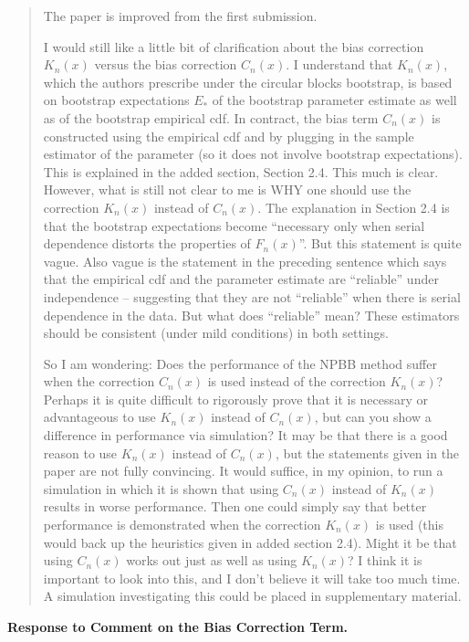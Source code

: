 \documentclass[12pt]{article}
\newenvironment{comment}%
{\begin{quotation}\noindent\small\it\color{darkblue}\ignorespaces%
}{\end{quotation}}
\begin{document}
\begin{comment}
The paper is improved from the first submission.


I would still like a little bit of clarification about the bias
correction $K_n(x)$ versus the bias correction $C_n(x)$. I understand
that $K_n(x)$, which the authors prescribe under the circular blocks
bootstrap, is based on bootstrap expectations $E_*$ of the bootstrap
parameter estimate as well as of the bootstrap empirical cdf. In
contract, the bias term $C_n(x)$ is constructed using the empirical
cdf and by plugging in the sample estimator of the parameter (so it
does not involve bootstrap expectations).  This is explained in the
added section, Section 2.4.  This much is clear. However, what is
still not clear to me is WHY one should use the correction $K_n(x)$
instead of $C_n(x)$. The explanation in Section 2.4 is that the
bootstrap expectations become ``necessary only when serial dependence
distorts the properties of $F_n(x)$''.  But this statement is quite
vague.  Also vague is the statement in the preceding sentence which
says that the empirical cdf and the parameter estimate are ``reliable''
under independence -- suggesting that they are not ``reliable'' when
there is serial dependence in the data.  But what does ``reliable''
mean? These estimators should be consistent (under mild conditions) in
both settings.


So I am wondering: Does the performance of the NPBB method suffer when
the correction $C_n(x)$ is used instead of the correction $K_n(x)$?
Perhaps it is quite difficult to rigorously prove that it is necessary
or advantageous to use $K_n(x)$ instead of $C_n(x)$, but can you show
a difference in performance via simulation?  It may be that there is a
good reason to use $K_n(x)$ instead of $C_n(x)$, but the statements
given in the paper are not fully convincing.   It would suffice, in my
opinion, to run a simulation in which it is shown that using $C_n(x)$
instead of $K_n(x)$ results in worse performance.  Then one could
simply say that better performance is demonstrated when the correction
$K_n(x)$ is used (this would back up the heuristics given in added
section 2.4). Might it be that using $C_n(x)$ works out just as well
as using $K_n(x)$?  I think it is important to look into this, and I
don't believe it will take too much time. A simulation investigating
this could be placed in supplementary material.
\end{comment}


\textbf{Response to Comment on the Bias Correction Term.}
\end{document}
